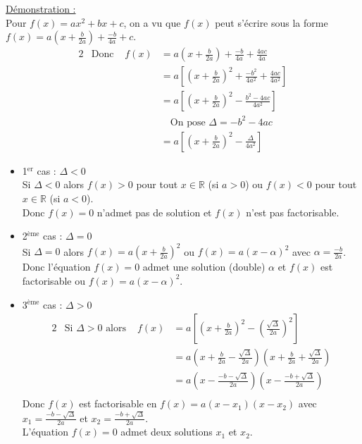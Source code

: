 \documentclass[11pt,a4paper]{article}
\begin{document}
\underline{Démonstration :} \\

Pour $f(x)=ax^2+bx+c$, on a vu que $f(x)$ peut s'écrire sous la forme $f(x)=a(x+\frac{b}{2a})+\frac{-b}{4a}+c$.
\begin{alignat*}{2}
     & \text{Donc } & f(x) & = a\left(x+\frac{b}{2a}\right)+\frac{-b}{4a}+\frac{4ac}{4a}                                         \\
     &              &      & = a\left[\left(x+\frac{b}{2a}\right)^2+\frac{-b^2}{4a^2}+\frac{4ac}{4a^2}\right]                    \\
     &              &      & = a\left[\left(x+\frac{b}{2a}\right)^2-\frac{b^2-4ac}{4a^2}\right] \\
     &              &      & \quad \text{On pose $\Delta=-b^2-4ac$} \\
     &              &      & = a\left[\left(x+\frac{b}{2a}\right)^2-\frac{\Delta}{4a^2}\right]
\end{alignat*}

\begin{itemize}
    \item 1$^{\text{er}}$ cas : $\Delta<0$ ~\\
          Si $\Delta<0$ alors $f(x)>0$ pour tout $x\in\mathbb{R}$ (si $a>0$) ou $f(x)<0$ pour tout $x\in\mathbb{R}$ (si $a<0$). \\
          Donc $f(x)=0$ n'admet pas de solution et $f(x)$ n'est pas factorisable.

    \item 2$^{\text{ème}}$ cas : $\Delta=0$ \\
          Si $\Delta=0$ alors $f(x)=a( x+\frac{b}{2a})^2$ ou $f(x)=a(x-\alpha)^2$ avec $\alpha=\frac{-b}{2a}$. \\
          Donc l'équation $f(x)=0$ admet une solution (double) $\alpha$ et $f(x)$ est factorisable ou $f(x)=a(x-\alpha)^2$.

    \item 3$^{\text{ème}}$ cas : $\Delta>0$
          \begin{alignat*}{2}
               & \text{Si $\Delta>0$ alors } & f(x) & = a\left[\left(x+\frac{b}{2a}\right)^2-\left(\frac{\sqrt{\Delta}}{2a}\right)^2\right]                      \\
               &                                   &      & =a\left(x+\frac{b}{2a}-\frac{\sqrt{\Delta}}{2a}\right)\left(x+\frac{b}{2a}+\frac{\sqrt{\Delta}}{2a}\right) \\
               &                                   &      & =a\left(x-\frac{-b-\sqrt{\Delta}}{2a}\right)\left(x-\frac{-b+\sqrt{\Delta}}{2a}\right)                     \\
          \end{alignat*}
          Donc $f(x)$ est factorisable en $f(x)=a(x-x_1)(x-x_2)$ avec $x_1=\frac{-b-\sqrt{\Delta}}{2a}$ et $x_2=\frac{-b+\sqrt{\Delta}}{2a}$. \\
          L'équation $f(x)=0$ admet deux solutions $x_1$ et $x_2$.
\end{itemize}
\end{document}
